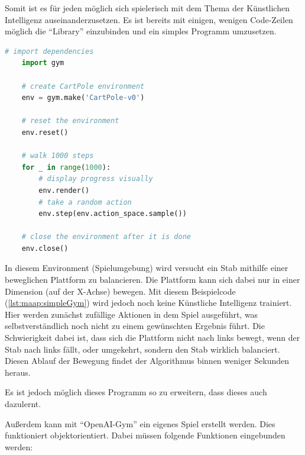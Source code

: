 Somit ist es für jeden möglich sich spielerisch mit dem Thema der Künstlichen Intelligenz auseinanderzusetzen. Es ist bereits mit einigen, wenigen Code-Zeilen möglich die ``Library'' einzubinden und ein simples Programm umzusetzen.
\begin{lstlisting}[language=Python,label=lst:maap:simpleGym,caption=Simples OpenAI-Gym Programm]
    # import dependencies
    import gym 

    # create CartPole environment
    env = gym.make('CartPole-v0') 

    # reset the environment
    env.reset() 

    # walk 1000 steps
    for _ in range(1000): 
        # display progress visually
        env.render() 
        # take a random action
        env.step(env.action_space.sample()) 
        
    # close the environment after it is done
    env.close()
\end{lstlisting}


In diesem Environment (Spielumgebung) wird versucht ein Stab mithilfe einer beweglichen Plattform zu balancieren. Die Plattform kann sich dabei nur in einer Dimension (auf der X-Achse) bewegen. Mit diesem Beispielcode (\ref{lst:maap:simpleGym}) wird jedoch noch keine Künstliche Intelligenz trainiert. Hier werden zunächst zufällige Aktionen in dem Spiel ausgeführt, was selbstverständlich noch nicht zu einem gewünschten Ergebnis führt. Die Schwierigkeit dabei ist, dass sich die Plattform nicht nach links bewegt, wenn der Stab nach links fällt, oder umgekehrt, sondern den Stab wirklich balanciert. Diesen Ablauf der Bewegung findet der Algorithmus binnen weniger Sekunden heraus.

Es ist jedoch möglich dieses Programm so zu erweitern, dass dieses auch dazulernt.

Außerdem kann mit ``OpenAI-Gym'' ein eigenes Spiel erstellt werden. Dies funktioniert objektorientiert. Dabei müssen folgende Funktionen eingebunden werden:


